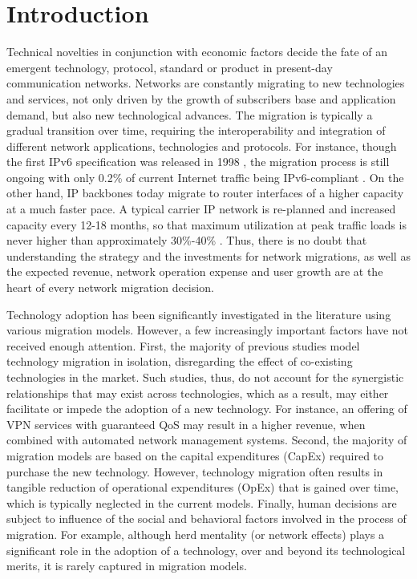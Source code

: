 \documentclass[smallextended]{svjour3}
\begin{document}
\newpage

\section{Introduction}

\par Technical novelties in conjunction with economic factors decide the fate of
an emergent technology, protocol, standard or product in present-day
communication networks. Networks are constantly migrating to new technologies
and services, not only driven by the growth of subscribers base and application
demand, but also new technological advances. The migration is typically a
gradual transition over time, requiring the interoperability and integration of
different network applications, technologies and protocols. For instance, though
the first IPv6 specification was released in 1998 \cite{rfc2460}, the migration
process is still ongoing with only 0.2\% of current Internet traffic being
IPv6-compliant \cite{ddosarbor}. On the other hand, IP backbones today migrate
to router interfaces of a higher capacity at a much faster pace. A typical
carrier IP network is re-planned and increased capacity every 12-18 months, so
that maximum utilization at peak traffic loads is never higher than
approximately 30\%-40\% \cite{headroom}.
Thus, there is no doubt that understanding the strategy and the investments for
network migrations, as well as the expected revenue, network operation expense
and user growth are at the heart of every network migration decision.

\par Technology adoption has been significantly investigated in the literature
using various migration models. However, a few increasingly important factors
have not received enough attention. First, the majority of previous studies
model technology migration in isolation, disregarding the effect of co-existing
technologies in the market. Such studies, thus, do not account for the
synergistic relationships that may exist across technologies, which as a result,
may either facilitate or impede the adoption of a new technology. For instance,
an offering of VPN services with guaranteed QoS may result in a higher revenue,
when combined with automated network management systems. Second, the majority of
migration models are based on the capital expenditures (CapEx) required to
purchase the new technology. However, technology migration often results in
tangible reduction of operational expenditures (OpEx) that is gained over time,
which is typically neglected in the current models. Finally, human decisions are
subject to influence of the social and behavioral factors involved in the
process of migration. For example, although herd mentality (or network effects)
plays a significant role in the adoption of a technology, over and beyond its
technological merits, it is rarely captured in migration models.
\end{document}
